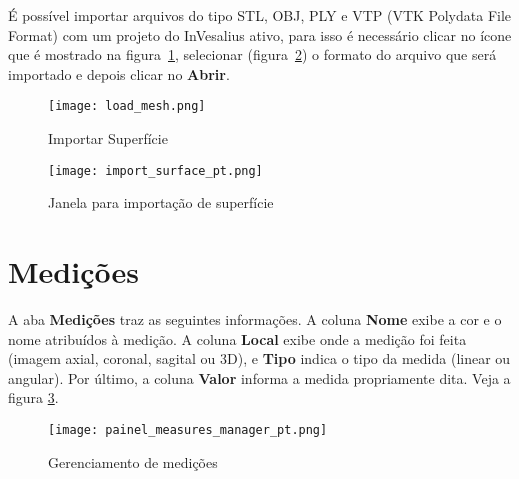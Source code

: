 É possível importar arquivos do tipo STL, OBJ, PLY e VTP (VTK Polydata File Format) com um projeto do InVesalius ativo, para isso é necessário clicar no ícone que é mostrado na figura~\ref{fig:import_stl}, selecionar (figura~\ref{fig:import_surface}) o formato do arquivo que será importado e depois clicar no \textbf{Abrir}.

\begin{figure}[!htb]
\centering
\texttt{[image: load\_mesh.png]}
\caption{Importar Superfície}
\label{fig:import_stl}
\end{figure}

\begin{figure}[!htb]
\centering
\texttt{[image: import\_surface\_pt.png]}
\caption{Janela para importação de superfície}
\label{fig:import_surface}
\end{figure}

\newpage


\section{Medições}

A aba \textbf{Medições} traz as seguintes informações. A coluna \textbf{Nome} exibe a cor e o
nome atribuídos à medição. A coluna \textbf{Local} exibe onde a medição foi feita (imagem axial,
coronal, sagital ou 3D), e \textbf{Tipo} indica o tipo da medida (linear ou angular). Por último,
a coluna \textbf{Valor} informa a medida propriamente dita. Veja a figura \ref{fig:manager_mensuares}.

\begin{figure}[!htb]
\centering
\texttt{[image: painel\_measures\_manager\_pt.png]}
\caption{Gerenciamento de medições}
\label{fig:manager_mensuares}
\end{figure}

